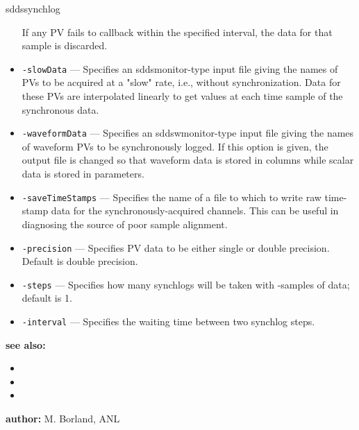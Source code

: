 \begin{sddsprog}{sddssynchlog}
\begin{itemize}
                If any PV fails to callback within the specified interval, the data for
                that sample is discarded.
  \item {\tt -slowData} --- Specifies an sddsmonitor-type input file giving the names of PVs to be
                acquired at a "slow" rate, i.e., without synchronization.  Data for these PVs
                are interpolated linearly to get values at each time sample of the synchronous
                data.
  \item {\tt -waveformData} --- Specifies an sddswmonitor-type input file giving the names of waveform PVs to
                be synchronously logged.  If this option is given, the output file is changed
                so that waveform data is stored in columns while scalar data is stored in
                parameters.
  \item {\tt -saveTimeStamps} --- Specifies the name of a file to which to write raw time-stamp data for the
                synchronously-acquired channels.  This can be useful in diagnosing the source
                of poor sample alignment.
  \item {\tt -precision} --- Specifies PV data to be either single or double precision.  Default is double precision.
  \item {\tt -steps} --- Specifies how many synchlogs will be taken with -samples of data; default is 1.
  \item {\tt -interval} --- Specifies the waiting time between two synchlog steps.
\end{itemize}

\item \textbf{see also:}
\begin{itemize}
  \item {}
  \item {}
  \item {}
\end{itemize}
\item \textbf{author:} M. Borland, ANL
\end{sddsprog}
